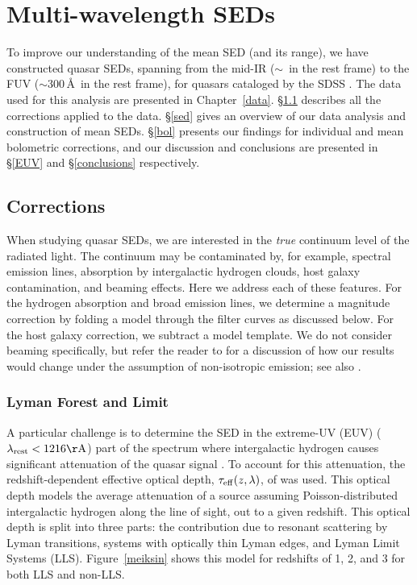 \chapter{Multi-wavelength SEDs} \label{SEDs}

To improve our understanding of the mean SED (and its range), we have constructed quasar SEDs, spanning from the mid-IR ($\sim$\thirtymum\ in the rest frame) to the FUV ($\sim$300\,\AA\ in the rest frame), for quasars cataloged by the SDSS \citep{York:2000}. The data used for this analysis are presented in Chapter~\ref{data}.  \S\ref{corrections} describes all the corrections applied to the data. \S\ref{sed} gives an overview of our data analysis and construction of mean SEDs. \S\ref{bol} presents our findings for individual and mean bolometric corrections, and our discussion and conclusions are presented in \S\ref{EUV} and \S\ref{conclusions} respectively.

\section{Corrections} \label{corrections}

When studying quasar SEDs, we are interested in the {\em true} continuum level of the radiated light.  The continuum may be contaminated by, for example, spectral emission lines, absorption by intergalactic hydrogen clouds, host galaxy contamination, and beaming effects.  Here we address each of these features.  For the hydrogen absorption and broad emission lines, we determine a magnitude correction by folding a model through the filter curves as discussed below.  For the host galaxy correction, we subtract a model template.  We do not consider beaming specifically, but refer the reader to \citet{Runnoe:2012} for a discussion of how our results would change under the assumption of non-isotropic emission; see also \citet{Nemmen:2010}.

\subsection{Lyman Forest and Limit}
\label{sec:hydrogen}

A particular challenge is to determine the SED in the extreme-UV (EUV) ($\lambda_{\rm rest}<1216{\rm \AA}$) part of the spectrum where intergalactic hydrogen causes significant attenuation of the quasar signal \citep[Ly$\alpha$ forest;][]{Lynds:1971}.  To account for this attenuation, the redshift-dependent effective optical depth, $\tau_{{\rm eff}}(z,\lambda)$, of \citet{Meiksin:2006} was used.  
This optical depth models the average attenuation of a source assuming Poisson-distributed intergalactic hydrogen along the line of sight, out to a given redshift.
This optical depth is split into three parts: the contribution due to resonant scattering by Lyman transitions, systems with optically thin Lyman edges, and Lyman Limit Systems (LLS). Figure~\ref{meiksin} shows this model for redshifts of 1, 2, and 3 for both LLS and non-LLS.  

